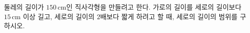 둘레의 길이가 $150\,\mathrm{cm}$인 직사각형을 만들려고 한다. 가로의 길이를 세로의 길이보다 $15\,\mathrm{cm}$ 이상 길고, 세로의 길이의 $2$배보다 짧게 하려고 할 때, 세로의 길이의 범위를 구하시오.
